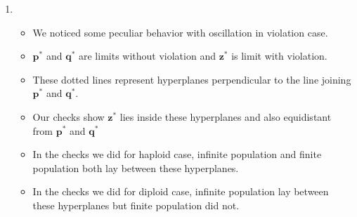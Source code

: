 \documentclass{article}
\begin{document}
\begin{enumerate}
\item
  \begin{itemize}
    \item We noticed some peculiar behavior with oscillation in violation case. 
    
    \item $\bm{p}^\ast$ and $\bm{q}^\ast$ are limits without violation and $\bm{z}^\ast$ is limit with violation.
    
    \item These dotted lines represent hyperplanes perpendicular to the line joining $\bm{p}^\ast$ and $\bm{q}^\ast$. 
    
    \item Our checks show $\bm{z}^\ast$ lies inside these hyperplanes and also equidistant from $\bm{p}^\ast$ and $\bm{q}^\ast$
   
    \item In the checks we did for haploid case, infinite population and finite population both lay between these hyperplanes.
 
    \item In the checks we did for diploid case, infinite population lay between these hyperplanes but finite population did not.
   
  \end{itemize}
  
% 
%   


\end{enumerate}
\end{document}
